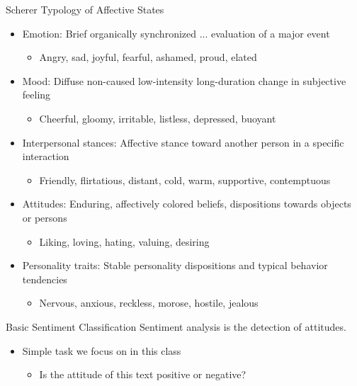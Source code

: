 \documentclass[handout]{beamer}
\begin{document}
\begin{frame}{Scherer Typology of Affective States}
    \scriptsize
    \begin{itemize}\scriptsize
        \item Emotion: Brief organically synchronized ... evaluation of a major event
        \begin{itemize}\scriptsize
            \item Angry, sad, joyful, fearful, ashamed, proud, elated
        \end{itemize}
        \item Mood: Diffuse non-caused low-intensity long-duration change in subjective feeling
        \begin{itemize}\scriptsize
            \item Cheerful, gloomy, irritable, listless, depressed, buoyant
        \end{itemize}
        \item Interpersonal stances: Affective stance toward another person in a specific interaction
        \begin{itemize}\scriptsize
            \item Friendly, flirtatious, distant, cold, warm, supportive, contemptuous
        \end{itemize}
        \item Attitudes: Enduring, affectively colored beliefs, dispositions towards objects or persons
        \begin{itemize}\scriptsize
            \item Liking, loving, hating, valuing, desiring
        \end{itemize}
        \item Personality traits: Stable personality dispositions and typical behavior tendencies
        \begin{itemize}\scriptsize
            \item Nervous, anxious, reckless, morose, hostile, jealous
        \end{itemize}
    \end{itemize}
\end{frame}

\begin{frame}{Basic Sentiment Classification}
    Sentiment analysis is the detection of attitudes.
    \begin{itemize}
        \item Simple task we focus on in this class
        \begin{itemize}
            \item Is the attitude of this text positive or negative?
        \end{itemize}
    \end{itemize}
\end{frame}
\end{document}

